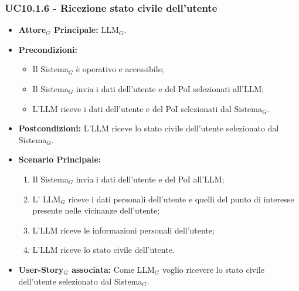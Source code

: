 \documentclass[10pt]{article}
\begin{document}
\begin{justify}
\subsubsection{\textbf{UC10.1.6 - Ricezione stato civile dell'utente}}
\begin{itemize}
    \item \textbf{Attore$_G$ Principale:} LLM$_G$.
    \item \textbf{Precondizioni:} 
        \begin{itemize}
          \item Il Sistema$_G$ è operativo e accessibile;
          \item Il Sistema$_G$ invia i dati dell'utente e del PoI selezionati all'LLM;
            \item L'LLM riceve i dati dell'utente e del PoI selezionati dal Sistema$_G$.
        \end{itemize}
      \item \textbf{Postcondizioni:} L'LLM riceve lo stato civile dell'utente selezionato dal Sistema$_G$.
    \item \textbf{Scenario Principale:} 
        \begin{enumerate}
          \item Il Sistema$_G$ invia i dati dell'utente e del PoI all'LLM;
        \item L' LLM$_G$ riceve i dati personali dell'utente e quelli del punto di interesse presente nelle vicinanze dell'utente;
          \item L'LLM riceve le informazioni personali dell'utente;
          \item L'LLM riceve lo stato civile dell'utente.
        \end{enumerate}
      \item \textbf{User-Story$_G$ associata:} Come LLM$_G$ voglio ricevere lo stato civile dell'utente selezionato dal Sistema$_G$.
\end{itemize}

\end{justify}
\end{document}

